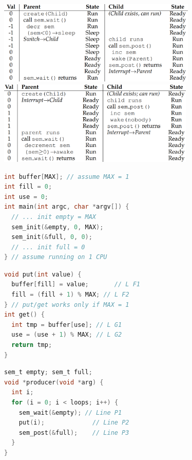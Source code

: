\documentclass[8pt,a4paper,landscape]{extarticle}
\begin{document}
\begin{multicols*}{3}
\includegraphics[width=\linewidth,height=4cm]{imgs/pwaitschd}
\includegraphics[width=\linewidth,height=4cm]{imgs/chdwaitsp}
\begin{minipage}{.5\linewidth}
\begin{lstlisting}[language=c,xleftmargin=2pt,xrightmargin=2pt]
int buffer[MAX]; // assume MAX = 1
int fill = 0;
int use = 0;
int main(int argc, char *argv[]) {
  // ... init empty = MAX
  sem_init(&empty, 0, MAX);
  sem_init(&full, 0, 0);
  // ... init full = 0
} // assume running on 1 CPU
\end{lstlisting}
\end{minipage}
\begin{minipage}{.5\linewidth}
\begin{lstlisting}[language=c,xleftmargin=2pt,xrightmargin=2pt]
void put(int value) {
  buffer[fill] = value;       // L F1
  fill = (fill + 1) % MAX; // L F2
} // put/get works only if MAX = 1
int get() {
  int tmp = buffer[use]; // L G1
  use = (use + 1) % MAX; // L G2
  return tmp;
}
\end{lstlisting}
\end{minipage}
\begin{minipage}{.5\linewidth}
\begin{lstlisting}[language=c,xleftmargin=2pt,xrightmargin=2pt]
sem_t empty; sem_t full;
void *producer(void *arg) {
  int i;
  for (i = 0; i < loops; i++) {
    sem_wait(&empty); // Line P1
    put(i);             // Line P2
    sem_post(&full);    // Line P3
  }
}
\end{lstlisting}
\end{minipage}
\begin{minipage}{.5\linewidth}
\begin{lstlisting}[language=c,xleftmargin=2pt,xrightmargin=2pt]

\end{lstlisting}
\end{minipage}
\end{multicols*}
\end{document}
